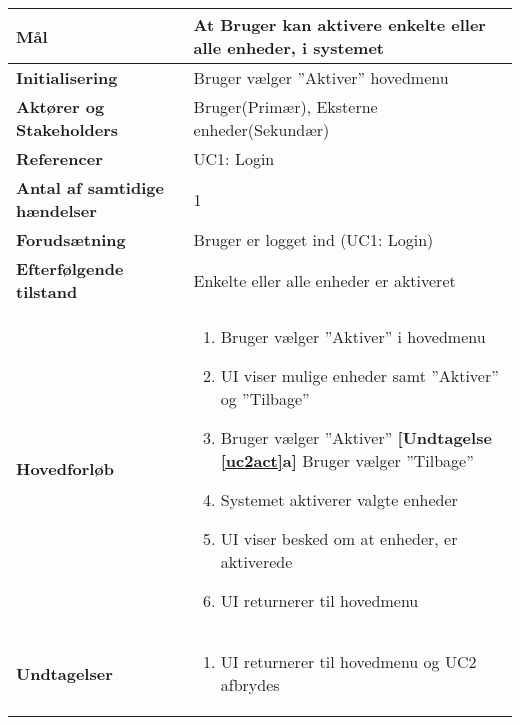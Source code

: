 \begin{table}[H] \centering
	\begin{tabular} {|p{6cm}|p{8cm}|}
	\hline		
		\textbf{Mål}							&At Bruger kan aktivere enkelte eller alle enheder, i systemet\\\hline
		\textbf{Initialisering}				&Bruger vælger ''Aktiver'' hovedmenu  	\\\hline
		\textbf{Aktører og Stakeholders}		&Bruger(Primær), Eksterne enheder(Sekundær) 		\\\hline
		\textbf{Referencer}					&UC1: Login					\\\hline
		\textbf{Antal af samtidige hændelser}&1 							\\\hline
		\textbf{Forudsætning}				&Bruger er logget ind (UC1: Login)\\\hline
		\textbf{Efterfølgende tilstand}		&Enkelte eller alle enheder er aktiveret  \\\hline
		\textbf{Hovedforløb}					
			&\begin{enumerate}				
					
				\item Bruger vælger ''Aktiver'' i hovedmenu
										
				\item \label{uc2menu}UI viser mulige enheder samt ''Aktiver'' og ''Tilbage''
												
				\item \label{uc2act} Bruger vælger ''Aktiver''\newline
					\textbf{[Undtagelse \ref{uc2act}a]} Bruger vælger ''Tilbage''
												
				\item \label{uc2sysact} Systemet aktiverer valgte enheder
				
				\item UI viser besked om at enheder, er aktiverede
																	
				\item UI returnerer til hovedmenu
												
			\end{enumerate}\\ \hline
		
		\textbf{Undtagelser}	
		
		&\begin{enumerate}[label= \ref{uc2act}a.]
			\item UI returnerer til hovedmenu og UC2 afbrydes
		\end{enumerate} \\\hline
											

	\end{tabular}
	\label{UC2} 
\end{table}